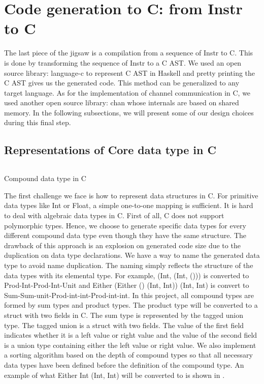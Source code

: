 \section{Code generation to C: from Instr to C}
The last piece of the jigsaw is a compilation from a sequence of Instr to C. This is done by transforming the sequence of Instr to a C AST. We used an open source library: language-c \cite{LanguagecAnalysisGeneration} to represent C AST in Haskell and pretty printing the C AST gives us the generated code. This method can be generalized to any target language. As for the implementation of channel communication in C, we used another open source library: chan \cite{treatPureImplementationGo2019} whose internals are based on shared memory. In the following subsections, we will present some of our design choices during this final step.
\subsection{Representations of Core data type in C}
\begin{listing}[ht]
    \inputminted{C}{codegen/data.c} 
    \caption{Compound data type in C}
    \label{codegen:code:data}
\end{listing}
The first challenge we face is how to represent data structures in C. For primitive data types like Int or Float, a simple one-to-one mapping is sufficient. It is hard to deal with algebraic data types in C. First of all, C does not support polymorphic types. Hence, we choose to generate specific data types for every different compound data type even though they have the same structure. The drawback of this approach is an explosion on generated code size due to the duplication on data type declarations. We have a way to name the generated data type to avoid name duplication. The naming simply reflects the structure of the data types with its elemental type. For example, (Int, (Int, ())) is converted to Prod-Int-Prod-Int-Unit and Either (Either () (Int, Int)) (Int, Int) is convert to Sum-Sum-unit-Prod-int-int-Prod-int-int. In this project, all compound types are formed by sum types and product types. The product type will be converted to a struct with two fields in C. The sum type is represented by the tagged union type. The tagged union is a struct with two fields. The value of the first field indicates whether it is a left value or right value and the value of the second field is a union type containing either the left value or right value. We also implement a sorting algorithm based on the depth of compound types so that all necessary data types have been defined before the definition of the compound type. An example of what Either Int (Int, Int) will be converted to is shown in .

